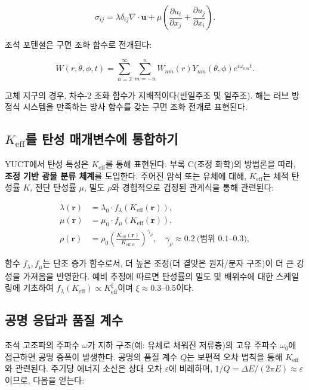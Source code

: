 \documentclass[12pt,a4paper]{article}
\theoremstyle{remark}
\newcommand{\Keff}{K_{\mathrm{eff}}}
\newcommand{\Keffzero}{K_{\mathrm{eff},0}}
\newcommand{\eps}{\varepsilon}
\begin{document}
	\begin{equation}
		\sigma_{ij} = \lambda \delta_{ij} \nabla \cdot \mathbf{u} + \mu \left(\frac{\partial u_i}{\partial x_j} + \frac{\partial u_j}{\partial x_i}\right).
		\label{eq:stress}
	\end{equation}
	
	조석 포텐셜은 구면 조화 함수로 전개된다:
	
	\begin{equation}
		W(r,\theta,\phi,t) = \sum_{n=2}^{\infty} \sum_{m=-n}^{n} W_{nm}(r) Y_{nm}(\theta,\phi) e^{i\omega_{nm}t}.
		\label{eq:tidal-potential}
	\end{equation}
	
	고체 지구의 경우, 차수-2 조화 함수가 지배적이다(반일주조 및 일주조). 해는 러브 방정식 시스템을 만족하는 방사 함수를 갖는 구면 조화 전개로 표현된다.
	
	\subsection{\(\Keff\)를 탄성 매개변수에 통합하기}
	
	YUCT에서 탄성 특성은 \(\Keff\)를 통해 표현된다. 부록 C(조정 화학)의 방법론을 따라, \textbf{조정 기반 광물 분류 체계}를 도입한다. 주어진 암석 또는 유체에 대해, \(\Keff\)는 체적 탄성률 \(K\), 전단 탄성률 \(\mu\), 밀도 \(\rho\)와 경험적으로 검정된 관계식을 통해 관련된다:
	
	\begin{align}
		\lambda(\mathbf{r}) &= \lambda_0 \cdot f_\lambda(\Keff(\mathbf{r})), \\
		\mu(\mathbf{r}) &= \mu_0 \cdot f_\mu(\Keff(\mathbf{r})), \\
		\rho(\mathbf{r}) &= \rho_0 \left(\frac{\Keff(\mathbf{r})}{\Keffzero}\right)^{\gamma_\rho}, \quad \gamma_\rho \approx 0.2\ \text{(범위 0.1–0.3)},
		\label{eq:keff-properties}
	\end{align}
	
	함수 \(f_\lambda, f_\mu\)는 단조 증가 함수로서, 더 높은 조정(더 결맞은 원자/분자 구조)이 더 큰 강성을 가져옴을 반영한다. 예비 추정에 따르면 탄성률의 밀도 및 배위수에 대한 스케일링에 기초하여 \(f_\lambda(\Keff) \propto \Keff^{\xi}\)이며 \(\xi \approx 0.3\)–\(0.5\)이다.
	
	\subsection{공명 응답과 품질 계수}
	
	조석 고조파의 주파수 \(\omega\)가 지하 구조(예: 유체로 채워진 저류층)의 고유 주파수 \(\omega_0\)에 접근하면 공명 증폭이 발생한다. 공명의 품질 계수 \(Q\)는 보편적 오차 법칙을 통해 \(\Keff\)와 관련된다. 주기당 에너지 소산은 상대 오차 \(\eps\)에 비례하며, \(1/Q = \Delta E / (2\pi E) \approx \eps\)이므로, 다음을 얻는다:
	
\end{document}
